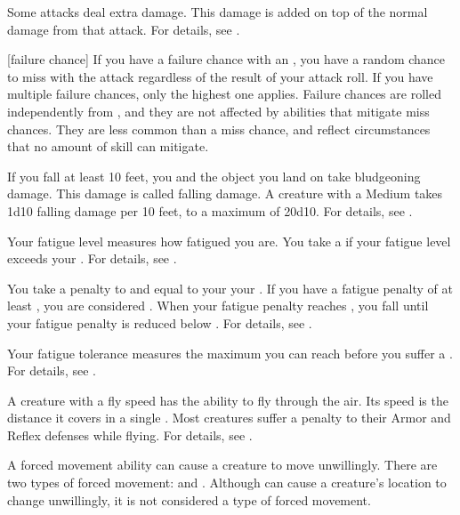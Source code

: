 Some attacks deal extra damage.
This damage is added on top of the normal damage from that attack.
For details, see .

[failure chance] If you have a failure chance with an , you have a random chance to miss with the attack regardless of the result of your attack roll.
If you have multiple failure chances, only the highest one applies.
Failure chances are rolled independently from , and they are not affected by abilities that mitigate miss chances.
They are less common than a miss chance, and reflect circumstances that no amount of skill can mitigate.

 If you fall at least 10 feet, you and the object you land on take bludgeoning damage.
This damage is called falling damage.
A creature with a Medium  takes 1d10 falling damage per 10 feet, to a maximum of 20d10.
For details, see .

 Your fatigue level measures how fatigued you are.
You take a  if your fatigue level exceeds your .
For details, see .

 You take a penalty to  and  equal to your  \sub your .
If you have a fatigue penalty of at least , you are considered .
When your fatigue penalty reaches , you fall \unconscious until your fatigue penalty is reduced below .
For details, see .

 Your fatigue tolerance measures the maximum  you can reach before you suffer a .
For details, see .

 A creature with a fly speed has the ability to fly through the air.
Its speed is the distance it covers in a single .
Most creatures suffer a  penalty to their Armor and Reflex defenses while flying.
For details, see .

 A forced movement ability can cause a creature to move unwillingly.
There are two types of forced movement:  and .
Although  can cause a creature's location to change unwillingly, it is not considered a type of forced movement.

